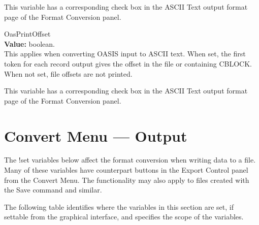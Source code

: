 \begin{description}
This variable has a corresponding check box in the {\cb ASCII Text}
output format page of the {\cb Format Conversion} panel.

\item{\et OasPrintOffset}\\
{\bf Value:} boolean.\\
This applies when converting OASIS input to ASCII text.  When set, the
first token for each record output gives the offset in the file or
containing CBLOCK.  When not set, file offsets are not printed.

This variable has a corresponding check box in the {\cb ASCII Text}
output format page of the {\cb Format Conversion} panel.
\end{description}


\section{Convert Menu --- Output}

The {\cb !set} variables below affect the format conversion when
writing data to a file.  Many of these variables have counterpart
buttons in the {\cb Export Control} panel from the {\cb Convert Menu}. 
The functionality may also apply to files created with the {\cb Save}
command and similar.

The following table identifies where the variables in this section are
set, if settable from the graphical interface, and specifies the scope
of the variables.

